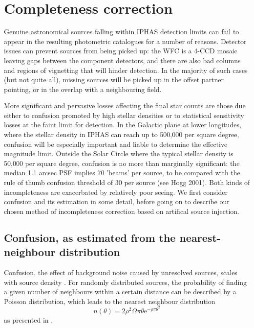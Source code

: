 \documentclass[a4paper,useAMS,usenatbib]{mn2e}
\begin{document}


\section[]{Completeness correction} 
\label{sec:completeness}

Genuine astronomical sources falling within IPHAS detection limits can fail to
appear in the resulting photometric catalogues for a number of reasons.   Detector issues can 
prevent sources from being picked up: the WFC is a 4-CCD mosaic leaving gaps
between the component detectors, and there are also bad columns and regions of
vignetting that will hinder detection. In the majority of such cases (but not quite all),
missing sources will be picked up in the offset partner pointing, or in the overlap with a 
neighbouring field.

More significant and pervasive losses affecting the final star counts are those
due either to confusion promoted by high stellar densities or to statistical sensitivity losses at the 
faint limit for detection.  In the Galactic plane at lower longitudes, where the stellar density in 
IPHAS can reach up to 500,000 per square degree, confusion will be especially important and liable to 
determine the effective magnitude limit.  Outside the Solar Circle where the typical stellar density is 
50,000 per square degree, confusion is no more than marginally significant: the median 1.1 arcsec PSF 
implies 70 'beams' per source, to be compared with the rule of thumb confusion threshold of 30 per 
source (see Hogg 2001).   Both kinds of incompleteness are exacerbated by relatively poor seeing.  We 
first consider confusion and its estimation in some detail, before going on to describe our chosen 
method of incompleteness correction based on artifical source injection.

\subsection{Confusion, as estimated from the nearest-neighbour distribution}

Confusion, the effect of background noise caused by unresolved sources, scales with source density \citep{Condon1974}. 
For randomly distributed sources, the probability of finding a given number of neighbours within a certain 
distance can be described by a Poisson distribution, which leads to the nearest neighbour distribution 
\begin{equation}
n(\theta) = 2\rho^2\Omega\pi\theta\mathrm{e}^{-\rho\pi\theta^2}
\label{eq:theoretical_neighbours}
\end{equation}
\noindent as presented in \citet{Bahcall1986}.
\end{document}
